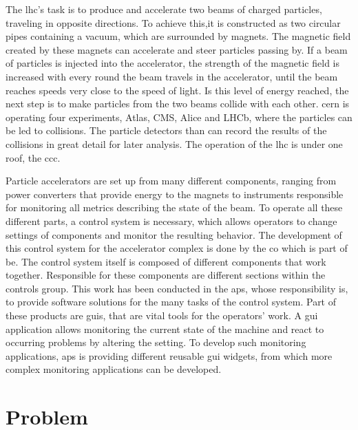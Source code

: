 The \gls{lhc}'s task is to produce and accelerate two beams of charged
particles, traveling in opposite directions. To achieve this,it is constructed
as two circular pipes containing a vacuum, which are surrounded by magnets. The
magnetic field created by these magnets can accelerate and steer particles
passing by. If a beam of particles is injected into the accelerator, the
strength of the magnetic field is increased with every round the beam travels in
the accelerator, until the beam reaches speeds very close to the speed of light.
Is this level of energy reached, the next step is to make particles from the two
beams collide with each other. \gls{cern} is operating four experiments, Atlas,
CMS, Alice and LHCb, where the particles can be led to collisions. The particle
detectors than can record the results of the collisions in great detail for
later analysis. The operation of the \gls{lhc} is under one roof, the \gls{ccc}.
\cite{CernLhc, HowParticleAccsWork}


Particle accelerators are set up from many different components, ranging from
power converters that provide energy to the magnets to instruments responsible
for monitoring all metrics describing the state of the beam. To operate all
these different parts, a control system is necessary, which allows operators to
change settings of components and monitor the resulting behavior. The
development of this control system for the accelerator complex is done by the
\gls{co} which is part of \gls{be}. \cite{ControlSystemBible} The control system
itself is composed of different components that work together. Responsible for
these components are different sections within the controls group.  This work
has been conducted in the \gls{aps}, whose responsibility is, to provide
software solutions for the many tasks of the control system. Part of these
products are \glspl{gui}, that are vital tools for the operators' work.  A
\gls{gui} application allows monitoring the current state of the machine and
react to occurring problems by altering the setting. To develop such monitoring
applications, \gls{aps} is providing different reusable \gls{gui} widgets, from
which more complex monitoring applications can be developed.





\section{Problem}
\label{sec:Introduction:problem}

